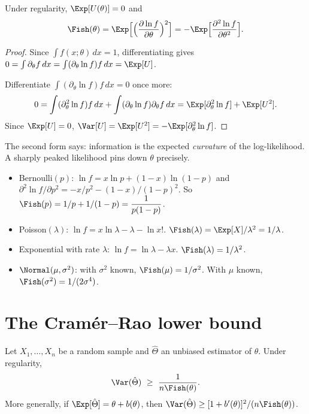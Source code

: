\begin{theorem}\label{thm:score}
Under regularity, $\Exp[U(\theta)]=0$ and
\[ \Fish(\theta)=\Exp\Big[\Big(\frac{\partial\ln f}{\partial\theta}\Big)^2\Big]=-\Exp\Big[\frac{\partial^2\ln f}{\partial\theta^2}\Big]. \]
\end{theorem}

\begin{proof}
Since $\int f(x;\theta)\,dx=1$, differentiating gives $0=\int\partial_\theta f\,dx=\int(\partial_\theta\ln f)f\,dx=\Exp[U]$.

Differentiate $\int(\partial_\theta\ln f)f\,dx=0$ once more:
\[ 0=\int(\partial_\theta^2\ln f)f\,dx+\int(\partial_\theta\ln f)\partial_\theta f\,dx=\Exp[\partial_\theta^2\ln f]+\Exp[U^2]. \]
Since $\Exp[U]=0$, $\Var[U]=\Exp[U^2]=-\Exp[\partial_\theta^2\ln f]$.
\end{proof}

The second form says: information is the expected \emph{curvature} of the log-likelihood. A sharply peaked likelihood pins down $\theta$ precisely.

\begin{example}\label{ex:fisher}
\begin{itemize}
  \item Bernoulli$(p)$: $\ln f=x\ln p+(1-x)\ln(1-p)$ and $\partial^2\ln f/\partial p^2=-x/p^2-(1-x)/(1-p)^2$. So $\Fish(p)=1/p+1/(1-p)=\dfrac1{p(1-p)}$.
  \item Poisson$(\lambda)$: $\ln f=x\ln\lambda-\lambda-\ln x!$. $\Fish(\lambda)=\Exp[X]/\lambda^2=1/\lambda$.
  \item Exponential with rate $\lambda$: $\ln f=\ln\lambda-\lambda x$. $\Fish(\lambda)=1/\lambda^2$.
  \item $\Normal(\mu,\sigma^2)$: with $\sigma^2$ known, $\Fish(\mu)=1/\sigma^2$. With $\mu$ known, $\Fish(\sigma^2)=1/(2\sigma^4)$.
\end{itemize}
\end{example}

\section{The Cram\'er--Rao lower bound}

\begin{theorem}\label{thm:cramerrao}
Let $X_1,\dots,X_n$ be a random sample and $\hat\Theta$ an unbiased estimator of $\theta$. Under regularity,
\[ \Var(\hat\Theta)\ \ge\ \frac1{n\Fish(\theta)}. \]
More generally, if $\Exp[\hat\Theta]=\theta+b(\theta)$, then $\Var(\hat\Theta)\ge[1+b'(\theta)]^2/(n\Fish(\theta))$.
\end{theorem}

